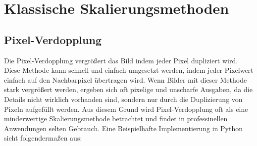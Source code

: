 \usepackage{amsmath}
\usepackage{amssymb}
\chapter{Klassische Skalierungsmethoden}

\section{Pixel-Verdopplung}
Die Pixel-Verdopplung vergrößert das Bild indem jeder Pixel dupliziert wird.
Diese Methode kann schnell und einfach umgesetzt werden, indem jeder Pixelwert einfach auf den Nachbarpixel übertragen wird. 
Wenn Bilder mit dieser Methode stark vergrößert werden, ergeben sich oft pixelige und unscharfe Ausgaben, da die Details nicht wirklich vorhanden sind, sondern nur durch die Duplizierung von Pixeln aufgefüllt werden. 
Aus diesem Grund wird Pixel-Verdopplung oft als eine minderwertige Skalierungsmethode betrachtet und findet in professinellen Anwendungen selten Gebrauch.
\newpage
Eine Beispielhafte Implementierung in Python sieht folgendermaßen aus: 

